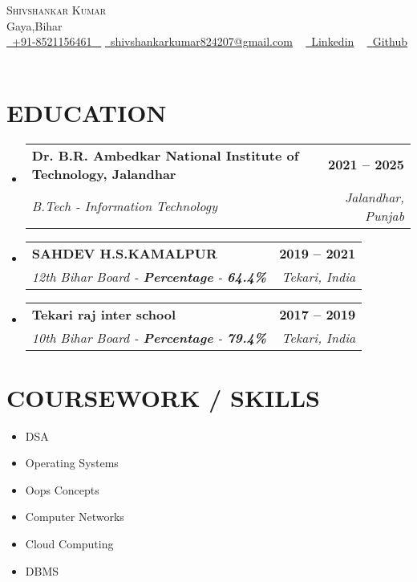 \documentclass[letterpaper,11pt]{article}
\makeatletter
\newcommand{\resumeSubheading}[4]{
  \vspace{-2pt}\item
    \begin{tabular*}{1.0\textwidth}[t]{l@{\extracolsep{\fill}}r}
      \textbf{\large#1} & \textbf{\small #2} \\
      \textit{\large#3} & \textit{\small #4} \\
      
    \end{tabular*}\vspace{-7pt}
}
\newcommand{\resumeSubHeadingListStart}{\begin{itemize}[leftmargin=0.0in, label={}]}
\newcommand{\resumeSubHeadingListEnd}{\end{itemize}}
\makeatother
\begin{document}


\begin{center}
    {\Huge \scshape Shivshankar Kumar} \\ \vspace{1pt}
    Gaya,Bihar \\ \vspace{1pt}
    \small \href{tel:#}{ \raisebox{-0.1\height}\faPhone\ \underline{+91-8521156461} ~} \href{mailto:shivshankarkumar824207@gmail.com}{\raisebox{-0.2\height}\faEnvelope\  \underline{shivshankarkumar824207@gmail.com}} ~ 
    \href{https://www.linkedin.com/in/shivshankar-kumar-2451b3239/}{\raisebox{-0.2\height}\faLinkedinSquare\ \underline{Linkedin}}  ~
    \href{https://github.com/Shankar21124100}{\raisebox{-0.2\height}\faGithub\ \underline{Github}} ~
    
    \vspace{-8pt}
   \end{center}
 \vspace{0.5mm}


\section{EDUCATION}
  \resumeSubHeadingListStart
    \resumeSubheading
      {Dr. B.R. Ambedkar National Institute of Technology, Jalandhar}{2021 – 2025}
      {B.Tech - Information Technology  \textbf{}  \textbf{}}{Jalandhar, Punjab}
  \resumeSubHeadingListEnd
   \resumeSubHeadingListStart
    \resumeSubheading
      {SAHDEV H.S.KAMALPUR}{2019 -- 2021}
      {12th Bihar Board  - \textbf{Percentage} - \textbf{64.4\%}}{Tekari, India}
  \resumeSubHeadingListEnd
   \resumeSubHeadingListStart
    \resumeSubheading
      {Tekari raj inter school }{2017 -- 2019}
      {10th Bihar Board  - \textbf{Percentage} - \textbf{79.4\%}}{Tekari, India}
  \resumeSubHeadingListEnd

\section{COURSEWORK / SKILLS}
        \begin{multicols}{3}
            \begin{itemize}[itemsep=-2pt, parsep=5pt]
                \item DSA
                \item Operating Systems
                \item Oops Concepts
                \item Computer Networks
                \item Cloud Computing
                \item DBMS
            \end{itemize}
        \end{multicols}
        \vspace*{0.5\multicolsep}
\end{document}
